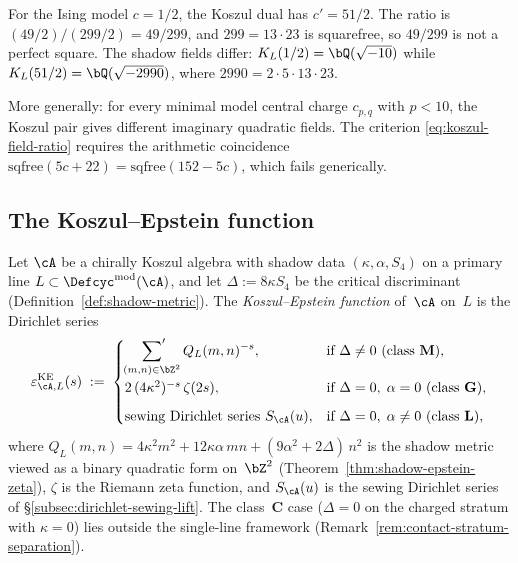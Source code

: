 \begin{remark}
\label{rem:koszul-field-failure}
For the Ising model $c = 1/2$, the Koszul dual has
$c' = 51/2$. The ratio is $(49/2)/(299/2) = 49/299$,
and $299 = 13 \cdot 23$ is squarefree, so $49/299$
is not a perfect square. The shadow fields differ:
$K_L(1/2) = \bQ(\sqrt{-10})$ while
$K_L(51/2) = \bQ(\sqrt{-2990})$,
where $2990 = 2 \cdot 5 \cdot 13 \cdot 23$.

More generally: for every minimal model central charge
$c_{p,q}$ with $p < 10$, the Koszul pair gives
different imaginary quadratic fields. The criterion
\eqref{eq:koszul-field-ratio} requires the arithmetic
coincidence $\mathrm{sqfree}(5c+22) =
\mathrm{sqfree}(152-5c)$, which fails generically.
\end{remark}

\subsection{The Koszul--Epstein function}%
\label{subsec:koszul-epstein-function}

\begin{definition}%
\label{def:koszul-epstein-function}%
%
%
Let $\cA$ be a chirally Koszul algebra with shadow data
$(\kappa, \alpha, S_4)$ on a primary line
$L \subset \Defcyc^{\mathrm{mod}}(\cA)$, and let
$\Delta := 8\kappa S_4$ be the critical discriminant
\textup{(}Definition~\textup{\ref{def:shadow-metric}}\textup{)}.
The \emph{Koszul--Epstein function} of~$\cA$ on~$L$ is the
Dirichlet series
\begin{equation}\label{eq:koszul-epstein-function}
 \varepsilon^{\mathrm{KE}}_{\cA,L}(s)
 \;:=\;
 \begin{cases}
 \displaystyle
 \sideset{}{'}\sum_{(m,n)\in\bZ^2}
 Q_L(m,n)^{-s},
 & \text{if } \Delta \neq 0
 \text{ \textup{(}class~$\mathbf{M}$\textup{)}},
 \\[12pt]
 2\,(4\kappa^2)^{-s}\,\zeta(2s),
 & \text{if } \Delta = 0,\; \alpha = 0
 \text{ \textup{(}class~$\mathbf{G}$\textup{)}},
 \\[6pt]
 \text{sewing Dirichlet series } S_\cA(u),
 & \text{if } \Delta = 0,\; \alpha \neq 0
 \text{ \textup{(}class~$\mathbf{L}$\textup{)}},
 \end{cases}
\end{equation}
where $Q_L(m,n) = 4\kappa^2 m^2 + 12\kappa\alpha\,mn
+ (9\alpha^2 + 2\Delta)\,n^2$ is the shadow metric viewed as
a binary quadratic form on~$\bZ^2$
\textup{(}Theorem~\textup{\ref{thm:shadow-epstein-zeta}}\textup{)},
$\zeta$ is the Riemann zeta function, and $S_\cA(u)$ is the
sewing Dirichlet series of
\S\textup{\ref{subsec:dirichlet-sewing-lift}}.
The class~$\mathbf{C}$ case
\textup{(}$\Delta = 0$ on the charged stratum with $\kappa = 0$\textup{)}
lies outside the single-line framework
\textup{(}Remark~\textup{\ref{rem:contact-stratum-separation}}\textup{)}.
\end{definition}

